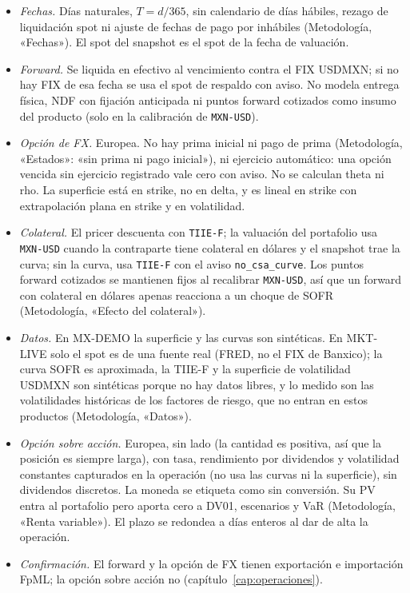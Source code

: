 \begin{limites}
  \begin{itemize}
    \item \emph{Fechas.} Días naturales, $T=d/365$, sin calendario de días hábiles, rezago de liquidación spot ni
          ajuste de fechas de pago por inhábiles (Metodología, «Fechas»). El spot del snapshot es el spot de la
          fecha de valuación.
    \item \emph{Forward.} Se liquida en efectivo al vencimiento contra el FIX USDMXN; si no hay FIX de esa
          fecha se usa el spot de respaldo con aviso. No modela entrega física, NDF con fijación anticipada
          ni puntos forward cotizados como insumo del producto (solo en la calibración de \texttt{MXN-USD}).
    \item \emph{Opción de FX.} Europea. No hay prima inicial ni pago de prima (Metodología, «Estados»: «sin prima ni pago
          inicial»), ni ejercicio automático: una opción vencida sin ejercicio registrado vale cero con aviso.
          No se calculan theta ni rho. La superficie está en strike, no en delta, y es lineal en strike con
          extrapolación plana en strike y en volatilidad.
    \item \emph{Colateral.} El pricer descuenta con \texttt{TIIE-F}; la valuación del portafolio usa
          \texttt{MXN-USD} cuando la contraparte tiene colateral en dólares y el snapshot trae la curva;
          sin la curva, usa \texttt{TIIE-F} con el aviso \texttt{no\_csa\_curve}. Los puntos forward cotizados se
          mantienen fijos al recalibrar \texttt{MXN-USD}, así que un forward con colateral en dólares apenas
          reacciona a un choque de SOFR (Metodología, «Efecto del colateral»).
    \item \emph{Datos.} En MX-DEMO la superficie y las curvas son sintéticas. En MKT-LIVE solo el spot es de
          una fuente real (FRED, no el FIX de Banxico); la curva SOFR es aproximada, la TIIE-F y la superficie
          de volatilidad USDMXN son sintéticas porque no hay datos libres, y lo medido son las volatilidades
          históricas de los factores de riesgo, que no entran en estos productos (Metodología, «Datos»).
    \item \emph{Opción sobre acción.} Europea, sin lado (la cantidad es positiva, así que la posición es
          siempre larga), con tasa, rendimiento por dividendos y volatilidad constantes capturados en la
          operación (no usa las curvas ni la superficie), sin dividendos discretos. La moneda se etiqueta como
          \MXN{} sin conversión. Su PV entra al portafolio pero aporta cero a DV01, escenarios y VaR
          (Metodología, «Renta variable»). El plazo se redondea a días enteros al dar de alta la operación.
    \item \emph{Confirmación.} El forward y la opción de FX tienen exportación e importación FpML; la opción
          sobre acción no (capítulo~\ref{cap:operaciones}).
  \end{itemize}
\end{limites}

